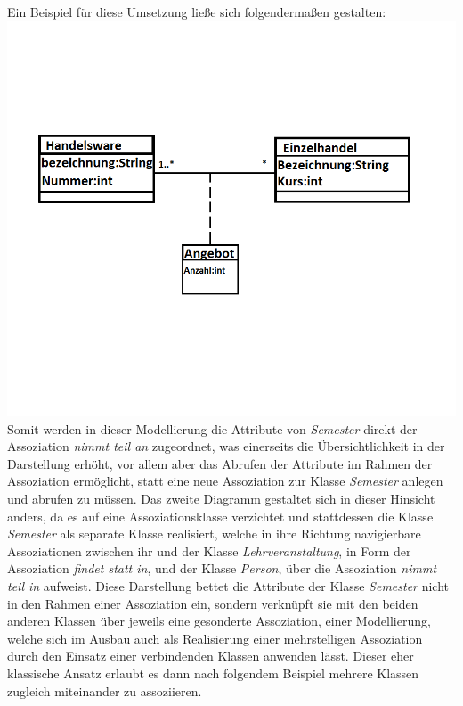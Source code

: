 \documentclass{swp1}
\begin{document}
Ein Beispiel für diese Umsetzung ließe sich folgendermaßen gestalten:
\newline
\includegraphics[scale=0.5]{Assoziationsklasse}
\newline
Somit werden in dieser Modellierung die Attribute von \emph{Semester} direkt der Assoziation \emph{nimmt teil an} zugeordnet, was einerseits die Übersichtlichkeit in der Darstellung erhöht, vor allem aber das Abrufen der Attribute im Rahmen der Assoziation ermöglicht, statt eine neue Assoziation zur Klasse \emph{Semester} anlegen und abrufen zu müssen.\newline
\newline
Das zweite Diagramm gestaltet sich in dieser Hinsicht anders, da es auf eine Assoziationsklasse verzichtet und stattdessen die Klasse \emph{Semester} als separate Klasse realisiert, welche in ihre Richtung navigierbare Assoziationen zwischen ihr und der Klasse \emph{Lehrveranstaltung}, in Form der Assoziation \emph{findet statt in}, und der Klasse \emph{Person}, über die Assoziation \emph{nimmt teil in} aufweist.\newline
Diese Darstellung bettet die Attribute der Klasse \emph{Semester} nicht in den Rahmen einer Assoziation ein, sondern verknüpft sie mit den beiden anderen Klassen über jeweils eine gesonderte Assoziation, einer Modellierung, welche sich im Ausbau auch als Realisierung einer mehrstelligen Assoziation durch den Einsatz einer verbindenden Klassen anwenden lässt. Dieser eher klassische Ansatz erlaubt es dann nach folgendem Beispiel mehrere Klassen zugleich miteinander zu assoziieren.\newline
\end{document}
